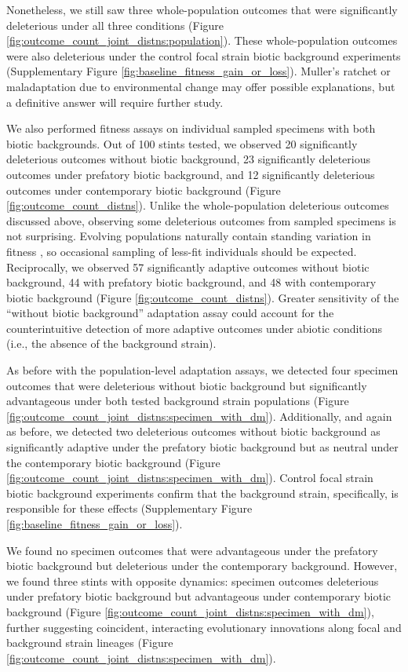 Nonetheless, we still saw three whole-population outcomes that were significantly deleterious under all three conditions (Figure \ref{fig:outcome_count_joint_distns:population}).
These whole-population outcomes were also deleterious under the control focal strain biotic background experiments (Supplementary Figure \ref{fig:baseline_fitness_gain_or_loss}).
Muller's ratchet \citep{andersson1996muller} or maladaptation due to environmental change \citep{brady2019causes} may offer possible explanations, but a definitive answer will require further study.

We also performed fitness assays on individual sampled specimens with both biotic backgrounds.
Out of 100 stints tested, we observed 20 significantly deleterious outcomes without biotic background, 23 significantly deleterious outcomes under prefatory biotic background, and 12 significantly deleterious outcomes under contemporary biotic background (Figure \ref{fig:outcome_count_distns}).
Unlike the whole-population deleterious outcomes discussed above, observing some deleterious outcomes from sampled specimens is not surprising.
Evolving populations naturally contain standing variation in fitness \citep{martin2016nonstationary}, so occasional sampling of less-fit individuals should be expected.
Reciprocally, we observed 57 significantly adaptive outcomes without biotic background, 44 with prefatory biotic background, and 48 with contemporary biotic background (Figure \ref{fig:outcome_count_distns}).
Greater sensitivity of the ``without biotic background'' adaptation assay could account for the counterintuitive detection of more adaptive outcomes under abiotic conditions (i.e., the absence of the background strain).

As before with the population-level adaptation assays, we detected four specimen outcomes that were deleterious without biotic background but significantly advantageous under both tested background strain populations (Figure \ref{fig:outcome_count_joint_distns:specimen_with_dm}).
Additionally, and again as before, we detected two deleterious outcomes without biotic background as significantly adaptive under the prefatory biotic background but as neutral under the contemporary biotic background (Figure \ref{fig:outcome_count_joint_distns:specimen_with_dm}).
Control focal strain biotic background experiments confirm that the background strain, specifically, is responsible for these effects (Supplementary Figure \ref{fig:baseline_fitness_gain_or_loss}).

We found no specimen outcomes that were advantageous under the prefatory biotic background but deleterious under the contemporary background.
However, we found three stints with opposite dynamics: specimen outcomes deleterious under prefatory biotic background but advantageous under contemporary biotic background (Figure \ref{fig:outcome_count_joint_distns:specimen_with_dm}), further suggesting coincident, interacting evolutionary innovations along focal and background strain lineages (Figure \ref{fig:outcome_count_joint_distns:specimen_with_dm}).

